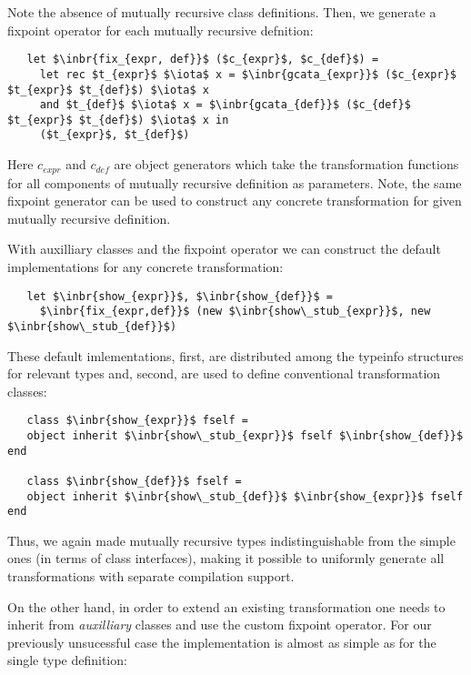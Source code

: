 Note the absence of mutually recursive class definitions. Then, we generate a fixpoint operator for each mutually recursive defnition:

\begin{lstlisting}
   let $\inbr{fix_{expr, def}}$ ($c_{expr}$, $c_{def}$) =
     let rec $t_{expr}$ $\iota$ x = $\inbr{gcata_{expr}}$ ($c_{expr}$ $t_{expr}$ $t_{def}$) $\iota$ x
     and $t_{def}$ $\iota$ x = $\inbr{gcata_{def}}$ ($c_{def}$ $t_{expr}$ $t_{def}$) $\iota$ x in
     ($t_{expr}$, $t_{def}$)
\end{lstlisting}

Here $c_{expr}$ and $c_{def}$ are object generators which take the transformation functions for all components of mutually recursive definition
as parameters. Note, the same fixpoint generator can be used to construct any concrete transformation for given mutually recursive definition.

With auxilliary classes and the fixpoint operator we can construct the default implementations for any concrete transformation:

\begin{lstlisting}
   let $\inbr{show_{expr}}$, $\inbr{show_{def}}$ =
     $\inbr{fix_{expr,def}}$ (new $\inbr{show\_stub_{expr}}$, new $\inbr{show\_stub_{def}}$) 
\end{lstlisting}

These default imlementations, first, are distributed among the typeinfo structures for relevant types and, second, are used to define conventional
transformation classes:

\begin{lstlisting}
   class $\inbr{show_{expr}}$ fself =
   object inherit $\inbr{show\_stub_{expr}}$ fself $\inbr{show_{def}}$ end

   class $\inbr{show_{def}}$ fself =
   object inherit $\inbr{show\_stub_{def}}$ $\inbr{show_{expr}}$ fself end
\end{lstlisting}

Thus, we again made mutually recursive types indistinguishable from the simple ones (in terms of class interfaces), making it possible to
uniformly generate all transformations with separate compilation support.

On the other hand, in order to extend an existing transformation one needs to inherit from \emph{auxilliary} classes and use the custom fixpoint operator.
For our previously unsucessful case the implementation is almost as simple as for the single type definition:

